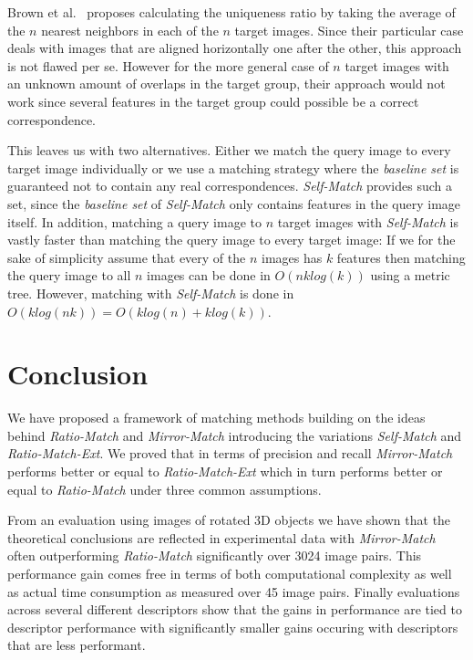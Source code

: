 \documentclass[journal]{IEEEtran}
\begin{document}
Brown et al.\ \cite{brown2005multi} proposes calculating the uniqueness 
ratio by taking the average of the $n$ nearest neighbors in each of the 
$n$ target images. Since their particular case deals with images that 
are aligned horizontally one after the other, this approach is not 
flawed per se. However for the more general case of $n$ target images 
with an unknown amount of overlaps in the target group, their approach 
would not work since several features in the target group could possible 
be a correct correspondence. 

This leaves us with two alternatives. Either we match the query image to 
every target image individually or we use a matching strategy where the 
\emph{baseline set} is guaranteed not to contain any real 
correspondences. \emph{Self-Match} provides such a set, since the 
\emph{baseline set} of \emph{Self-Match} only contains features in the 
query image itself. In addition, matching a query image to $n$ target 
images with \emph{Self-Match} is vastly faster than matching the query 
image to every target image: If we for the sake of simplicity assume 
that every of the $n$ images has $k$ features then matching the query 
image to all $n$ images can be done in $O(nklog(k))$ using a metric 
tree. However, matching with \emph{Self-Match} is done in $O(klog(nk)) =
O(klog(n) + klog(k))$.

\section{Conclusion}
\label{S:Summary}

We have proposed a framework of matching methods building on the ideas 
behind \emph{Ratio-Match} and \emph{Mirror-Match} introducing the 
variations \emph{Self-Match} and \emph{Ratio-Match-Ext}. We proved that 
in terms of precision and recall \emph{Mirror-Match} performs better or 
equal to \emph{Ratio-Match-Ext} which in turn performs better or equal 
to \emph{Ratio-Match} under three common assumptions.

From an evaluation using images of rotated 3D objects we have shown that
the theoretical conclusions are reflected in experimental data with 
\emph{Mirror-Match} often outperforming \emph{Ratio-Match}
significantly over 3024 image pairs. This performance gain comes free in 
terms of both computational complexity as well as actual time 
consumption as measured over 45 image pairs. Finally evaluations across 
several different descriptors show that the gains in performance are 
tied to descriptor performance with significantly smaller gains occuring 
with descriptors that are less performant.
\end{document}
